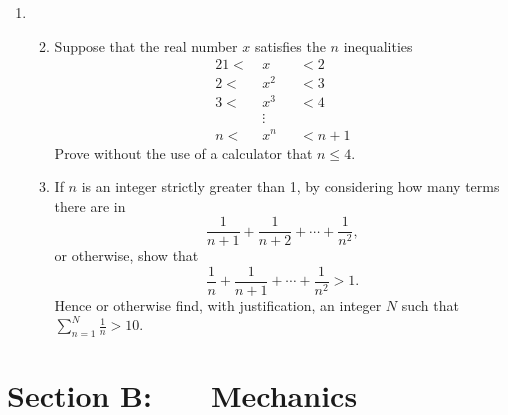 \documentclass[a4, 11pt]{report}
\newlength{\qspace}
\newcounter{qnumber}
\newenvironment{question}%
 {\vspace{\qspace}
  \begin{enumerate}[\bfseries 1\quad][10]%
    \setcounter{enumi}{\value{qnumber}}%
    \item%
 }
{
  \end{enumerate}
  \filbreak
  \stepcounter{qnumber}
 }
\newenvironment{questionparts}[1][1]%
 {
  \begin{enumerate}[\bfseries (i)]%
    \setcounter{enumii}{#1}
    \addtocounter{enumii}{-1}
    \setlength{\itemsep}{5mm}
    \setlength{\parskip}{8pt}
 }
 {
  \end{enumerate}
 }
\begin{document}
		
\begin{question}
\begin{questionparts}
\item{Suppose that the real number $x$ satisfies the $n$ inequalities
\begin{alignat*}{2}
1<\  & x &  & <2\\
2<\  & x^{2} &  & <3\\
3<\  & x^{3} &  & <4\\
 & \vdots\\
n<\  & x^{n} &  & <n+1
\end{alignat*}
Prove without the use of a calculator that $n\leqslant4$. }


\item{If $n$ is an integer strictly greater than 1, by considering
how many terms there are in 
\[
\frac{1}{n+1}+\frac{1}{n+2}+\cdots+\frac{1}{n^{2}},
\]
or otherwise, show that 
\[
\frac{1}{n}+\frac{1}{n+1}+\cdots+\frac{1}{n^{2}}>1.
\]
Hence or otherwise find, with justification, an integer $N$ such
that ${\displaystyle {\displaystyle \sum_{n=1}^{N}\frac{1}{n}>10.}}$} 
\end{questionparts}
\end{question}

\newpage
\section*{Section B: \ \ \ Mechanics}
\end{document}

